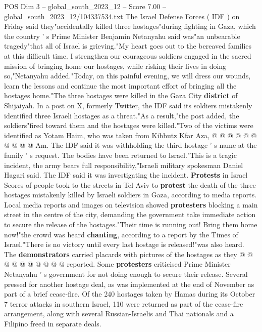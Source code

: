 \begin{textsample}{POS Dim 3 – global\_south\_2023\_12 – Score 7.00 – global\_south\_2023\_12/104337534.txt}  \label{ex:f3_pos_443}
The Israel Defense Forces ( IDF ) on Friday said they"accidentally killed three hostages"during fighting in Gaza, which the country ' s Prime Minister Benjamin Netanyahu said was"an unbearable tragedy"that all of Israel is grieving."My heart goes out to the bereaved families at this difficult time.
I strengthen our courageous soldiers engaged in the sacred mission of bringing home our hostages, while risking their lives in doing so,"Netanyahu added."Today, on this painful evening, we will dress our wounds, learn the lessons and continue the most important effort of bringing all the hostages home."The three hostages were killed in the Gaza City \textbf{district} of Shijaiyah.
In a post on X, formerly Twitter, the IDF said its soldiers mistakenly identified three Israeli hostages as a threat."As a result,"the post added, the soldiers"fired toward them and the hostages were killed."Two of the victims were identified as Yotam Haim, who was taken from Kibbutz Kfar Aza, @ @ @ @ @ @ @ @ @ @ Am.
The IDF said it was withholding the third hostage ' s name at the family ' s request.
The bodies have been returned to Israel."This is a tragic incident, the army bears full responsibility,"Israeli military spokesman Daniel Hagari said.
The IDF said it was investigating the incident. \textbf{Protests} in Israel Scores of people took to the streets in Tel Aviv to \textbf{protest} the death of the three hostages mistakenly killed by Israeli soldiers in Gaza, according to media reports.
Local media reports and images on television showed \textbf{protesters} blocking a main street in the centre of the city, demanding the government take immediate action to secure the release of the hostages."Their time is running out!
Bring them home now!"the crowd was heard \textbf{chanting}, according to a report by the Times of Israel."There is no victory until every last hostage is released!"was also heard.
The \textbf{demonstrators} carried placards with pictures of the hostages as they @ @ @ @ @ @ @ @ @ @ reported.
Some \textbf{protesters} criticised Prime Minister Netanyahu ' s government for not doing enough to secure their release.
Several pressed for another hostage deal, as was implemented at the end of November as part of a brief cease-fire.
Of the 240 hostages taken by Hamas during its October 7 terror attacks in southern Israel, 110 were returned as part of the cease-fire arrangement, along with several Russian-Israelis and Thai nationals and a Filipino freed in separate deals.

\end{textsample}

